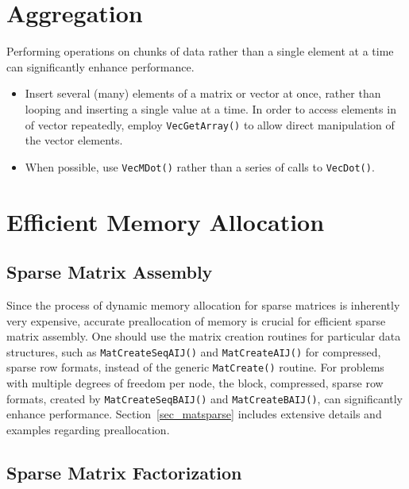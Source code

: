 {{\section{Aggregation}

Performing operations on chunks of data rather than a single element
at a time can significantly enhance performance.
\begin{itemize}
\item Insert several (many) elements of a matrix or vector at once, rather
   than looping and inserting a single value at a time.  In order to
   access elements in of vector repeatedly, employ {\lstinline{VecGetArray()}} to allow
   direct manipulation of the vector elements.

\item When possible, use \lstinline{VecMDot()} rather than a series of calls to \lstinline{VecDot()}.
\end{itemize}

\section{Efficient Memory Allocation}
\label{sec_perf_memory}

\subsection{Sparse Matrix Assembly}

Since the process of dynamic memory allocation for sparse matrices is
inherently very expensive, accurate preallocation of memory is crucial
for efficient sparse matrix assembly.  One should use the matrix creation
routines for particular data structures, such as \lstinline{MatCreateSeqAIJ()} and \lstinline{MatCreateAIJ()} for compressed, sparse
row formats, instead of the generic \lstinline{MatCreate()} routine.  For
problems with multiple degrees of freedom per node, the block,
compressed, sparse row formats, created by \lstinline{MatCreateSeqBAIJ()}
and \lstinline{MatCreateBAIJ()}, can significantly enhance performance.
Section~\ref{sec_matsparse} includes extensive details and
examples regarding preallocation.

\subsection{Sparse Matrix Factorization}
\label{sec_symbolfactor}

}}
